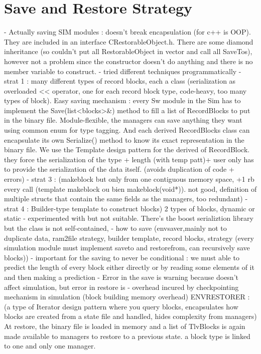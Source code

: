 {\section{Save and Restore Strategy}
- Actually saving SIM modules : doesn't break encapsulation (for c++ is OOP). They are included in an interface CRestorableObject.h. There are some diamond inheritance (so couldn't put all RestorableObject in vector and call all SaveTos), however not a problem since the constructor doesn't do anything and there is no member variable to construct.
- tried different techniques programmatically
- strat 1 : many different types of record blocks, each a class  (serialization as overloaded << operator, one for each record block type, code-heavy, too many types of block). Easy saving mechanism : every Sw module in the Sim has to implement the Save(list<blocks>\&) method to fill a list of RecordBlocks to put in the binary file. Module-flexible, the managers can save anything they want using common enum for type tagging. And each derived RecordBlocks class can encapsulate its own Serialize() method to know its exact representation in the binary file. We use the Template design pattern for the derived of RecordBlock. they force the serialization of the type + length (with temp patt)+ user only has to provide the serialization of the data itself. (avoids duplication of code + errors)
- strat 3 : (makeblock but only from one contiguous memory space, +1 rb every call (template makeblock ou bien makeblock(void*)). not good, definition of multiple structs that contain the same fields as the managers, too redundant)
- strat 4 : Builder-type template to construct blocks) 2 types of blocks, dynamic or static
- experimented with %
but not suitable. There's the boost serializtion library but the class is not self-contained, 
- how to save (envsaver,mainly not to duplicate data, ram2file strategy, builder template, record blocks, strategy (every simulation module must implement saveto and restorefrom, can recursively save blocks))
- important for the saving to never be conditional : we must able to predict the length of every block either directly or by reading some elements of it and then making a prediction
- Error in the save is warning because doesn't affect simulation, but error in restore is 
- overhead incured by checkpointing mechanism in simulation (block building memory overhead)
ENVRESTORER : (a type of Iterator design pattern where you query blocks, encapsulates how blocks are created from a state file and handled, hides complexity from managers) At restore, the binary file is loaded in memory and a list of TlvBlocks is again made available to managers to restore to a previous state. a block type is linked to one and only one manager. 

}
